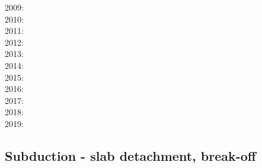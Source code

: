 {2009: \cite{yahb09}\cite{bill09}\cite{fagb09}\cite{bejb09}\cite{kecw09}\cite{gecm09}\cite{gefc09}
      \cite{famg09}\cite{lige09}\cite{moct09}\cite{lohb09}\cite{befa09}\cite{agyj09}\cite{yamb09}
      \cite{huby09}\\
2010: \cite{hagr10}\cite{lobh10}\cite{mamb10}\cite{camg10}\cite{casm10}\cite{ligb10}\cite{stfc10}
      \cite{moyb10}\cite{zhst10}\cite{qusp10}\cite{moht10}\cite{leki10}\cite{sigb10}\cite{stsf10}\\
2011: \cite{lixg11}\cite{list11}\cite{bubj11}\cite{bagw11b}\cite{cafz11}\cite{geme11}\cite{qube11}
      \cite{blgg11}\cite{gery11b}\cite{leki11}\cite{scsf11}\\
2012: \cite{anwb12}\cite{jahu12}\cite{jabi12}\cite{jabk12}\cite{lixg12}\cite{grpy12}\cite{grpy12b}
      \cite{ronb12}\cite{tebu12}\cite{thka12}\cite{bova12}\cite{civs12}\cite{camo12}\cite{cafa12} 
      \cite{gebk12}\cite{liri12}\cite{beva12}\cite{uegb12}\cite{bija12}\cite{sigb12}\cite{vogc12}\\
2013: \cite{nabg13}\cite{hage13}\cite{ancv13}\cite{namu13}\cite{yosh13}\cite{zhgt13}\cite{lixg13} 
      \cite{jabr13}\cite{izht13}\cite{luws13}\cite{dusc13}\cite{tibb13}\cite{bubj13}\cite{scmo13} 
      \cite{fuob13}\cite{magc13}\cite{musi13}\cite{mibg13}\cite{grpy13}\cite{vagd13a}\cite{vagd13b}
      \cite{cavg13}\cite{vocg13}\cite{qula13}\cite{bugu13}\\
2014: \cite{robn14}\cite{hond14}\cite{ronc14}\cite{mobm14}\cite{famc14}\cite{fogm14}\cite{frba14} 
      \cite{gagd14}\cite{voge14}\cite{voge14b}\cite{lidr14}\cite{bocj04}\cite{bagb14}\cite{stjm14}
      \cite{basc14}\cite{vamd14}\cite{kile14}\cite{jahm14}\cite{bufa14}\cite{bufy14b}\cite{chsv14}
      \cite{chsg14}\cite{sigb14}\cite{shjm14}\\
2015: \cite{bemm15}\cite{bomv15}\cite{bogf15}\cite{ceag15}\cite{kifr15}\cite{vami15}\cite{dali15}\\
2016: \cite{tomy16}\cite{gukt16}\cite{robn16}\cite{mavm16}\\
2017: \cite{kicf17}\cite{sche17}\cite{pest17}\cite{vomc17}\cite{majf17}\cite{yabr17}\\
2018: \cite{yamz18}\cite{crli18}\cite{spcv18}\cite{chss18}\cite{yagz18}\cite{mazh18}\\
2019: \cite{magn19}\cite{mavb19}\cite{scvm19}\cite{cakc19}\cite{samo19}\cite{sihf19}\cite{meag19}
}

\subsection{Subduction - slab detachment, break-off}
 

